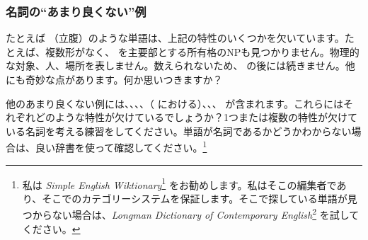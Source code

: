 \subsubsection*{名詞の\enquote{あまり良くない}例}
たとえば （立腹）のような単語は、上記の特性のいくつかを欠いています。たとえば、複数形がなく、 を主要部とする所有格のNPも見つかりません。物理的な対象、人、場所を表しません。数えられないため、 の後には続きません。他にも奇妙な点があります。何か思いつきますか？

他のあまり良くない例には、、、、（ における）、、、 が含まれます。これらにはそれぞれどのような特性が欠けているでしょうか？1つまたは複数の特性が欠けている名詞を考える練習をしてください。単語が名詞であるかどうかわからない場合は、良い辞書を使って確認してください。\footnote{私は \textit{Simple English Wiktionary}\footnote{\url{https://simple.wiktionary.org/wiki/Main_Page}} をお勧めします。私はそこの編集者であり、そこでのカテゴリーシステムを保証します。そこで探している単語が見つからない場合は、\textit{Longman Dictionary of Contemporary English}\footnote{\url{https://www.ldoceonline.com/}} を試してください。}


